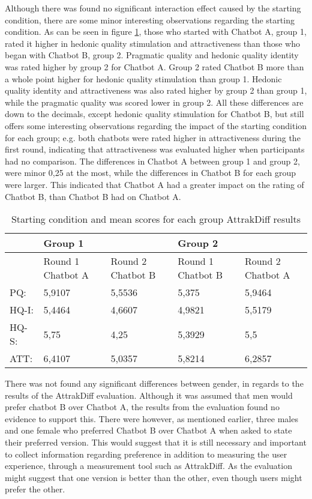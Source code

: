 Although there was found no significant interaction effect caused by the starting condition, there are some minor interesting observations regarding the starting condition. As can be seen in figure \ref{tab:startconmean}, those who started with Chatbot A, group 1, rated it higher in hedonic quality stimulation and attractiveness than those who began with Chatbot B, group 2. Pragmatic quality and hedonic quality identity was rated higher by group 2 for Chatbot A. Group 2 rated Chatbot B more than a whole point higher for hedonic quality stimulation than group 1. Hedonic quality identity and attractiveness was also rated higher by group 2 than group 1, while the pragmatic quality was scored lower in group 2. All these differences are down to the decimals, except hedonic  quality stimulation for Chatbot B, but still offers some interesting observations regarding the impact of the starting condition for each group; e.g. both chatbots were rated higher in attractiveness during the first round, indicating that attractiveness was evaluated higher when participants had no comparison. The differences in Chatbot A between group 1 and group 2, were minor 0,25 at the most, while the differences in Chatbot B for each group were larger. This indicated that Chatbot A had a greater impact on the rating of Chatbot B, than Chatbot B had on Chatbot A.

\begin{table}[H]
\centering
\begin{tabular}{lll|ll}
\hline
& Group 1 &  & Group 2 &  \\
\hline
& Round 1 Chatbot A & Round 2 Chatbot B & Round 1 Chatbot B & Round 2 Chatbot A \\
\hline
PQ: & 5,9107 & 5,5536 & 5,375 & 5,9464 \\
HQ-I: & 5,4464 & 4,6607 & 4,9821 & 5,5179 \\
HQ-S: & 5,75 & 4,25 & 5,3929 & 5,5 \\
ATT: & 6,4107 & 5,0357 & 5,8214 & 6,2857 \\
\end{tabular}
\caption{Starting condition and mean scores for each group AttrakDiff results}
    \label{tab:startconmean}
\end{table}

There was not found any significant differences between gender, in regards to the results of the AttrakDiff evaluation. Although it was assumed that men would prefer chatbot B over Chatbot A, the results from the evaluation found no evidence to support this. There were however, as mentioned earlier, three males and one female who preferred Chatbot B over Chatbot A when asked to state their preferred version. This would suggest that it is still necessary and important to collect information regarding preference in addition to measuring the user experience, through a measurement tool such as AttrakDiff. As the evaluation might suggest that one version is better than the other, even though users might prefer the other.


